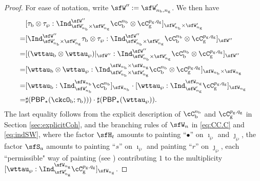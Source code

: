 \documentclass[12pt]{amsart}
\numberwithin{equation}{section}
\theoremstyle{remark}
\def\nbb{n_{\mathrm b}}
\def\PBP{\mathsf{PBP}}
\begin{document}
{\begin{proof}
  For ease of notation, write $\sfW'':=\sfW_{n_{\mathrm b},n_{\mathrm g}}'$. We then have
  \[
    \begin{split}
      & [\tau_{\mathrm b}\otimes \tau_{\wp} :
      \Ind_{\sfW'_{n_{\mathrm b}}\times \sfW'_{n_{\mathrm g}}}^{\sfW''} \cC_{\mathrm b}^{\nbb} \otimes \cC_{\mathrm g}^{p_{\mathrm g},q_{\mathrm g}}]_{\sfW'_{n_{\mathrm b}}\times \sfW'_{n_{\mathrm g}}}\\
      = & [\Ind_{\sfW'_{n_{\mathrm b}}\times \sfW'_{n_{\mathrm g}}}^{\sfW''} \tau_{\mathrm b}\otimes \tau_{\wp} :
      \Ind_{\sfW'_{n_{\mathrm b}}\times \sfW'_{n_{\mathrm g}}}^{\sfW''} \cC_{\mathrm b}^{\nbb} \otimes \cC_{\mathrm g}^{p_{\mathrm g},q_{\mathrm g}}]_{\sfW''}\\
      = & [(\wttau_{\mathrm b}\otimes \wttau_{\wp})|_{\sfW''}:
      \Ind_{\sfW'_{n_{\mathrm b}}\times \sfW'_{n_{\mathrm g}}}^{\sfW''} \cC_{\mathrm b}^{\nbb} \otimes \cC_{\mathrm g}^{p_{\mathrm g},q_{\mathrm g}}]_{\sfW''}\\
      = & [\wttau_{\mathrm b}\otimes \wttau_{\wp}:
      \Ind_{\sfW'_{n_{\mathrm b}}\times \sfW'_{n_{\mathrm g}}}^{\sfW_{n_{\mathrm b}}\times \sfW_{n_{\mathrm g}}} \cC_{\mathrm b}^{\nbb} \otimes \cC_{\mathrm g}^{p_{\mathrm g},q_{\mathrm g}}]_{\sfW_{n_{\mathrm b}}\times \sfW_{n_{\mathrm g}}}\\
       = & [\wttau_{\mathrm b}:\Ind_{\sfW'_{n_{\mathrm b}}}^{\sfW_{n_{\mathrm b}}} \cC_{\mathrm b}^{\nbb}]_{\sfW_{n_{\mathrm b}}}\cdot
           [\wttau_{\wp}:\Ind_{\sfW'_{n_{\mathrm g}}}^{\sfW_{n_{\mathrm g}}} \cC_{\mathrm g}^{p_{\mathrm g},q_{\mathrm g}}]_{\sfW_{n_{\mathrm g}}}\\
      =& \sharp(\PBP_{\star}(\ckcO_{\mathrm b}; \tau _{\mathrm b})))\cdot \sharp(\PBP_{\star}(\wttau_{\wp})).
    \end{split}
  \]
  The last equality follows from the explicit description of $\cC_{\mathrm b}^{\nbb}$ and $\cC_{\mathrm g}^{p_{\mathrm g},q_{\mathrm g}}$ in Section \ref{sec:explicitCoh}, and
  the branching rules of $\sfW_{n}$ in \eqref{eq:CC.C} and \eqref{eq:indSW}, where the factor $\sfH_{t}$ amounts to painting ``$\bullet$'' on $\imath_{\wp}$ and $\jmath_{\wp}$, the factor $\sfS_{a}$ amounts to painting ``$s$'' on $\imath_{\wp}$ and painting ``$r$'' on $\jmath_{\wp}$, each ``permissible" way of painting (see )
  contributing $1$ to the multiplicity $[\wttau_{\wp}:\Ind_{\sfW'_{n_{\mathrm g}}}^{\sfW_{n_{\mathrm g}}} \cC_{\mathrm g}^{p_{\mathrm g},q_{\mathrm g}}]_{\sfW_{n_{\mathrm g}}}$.
\end{proof}

}
\end{document}
